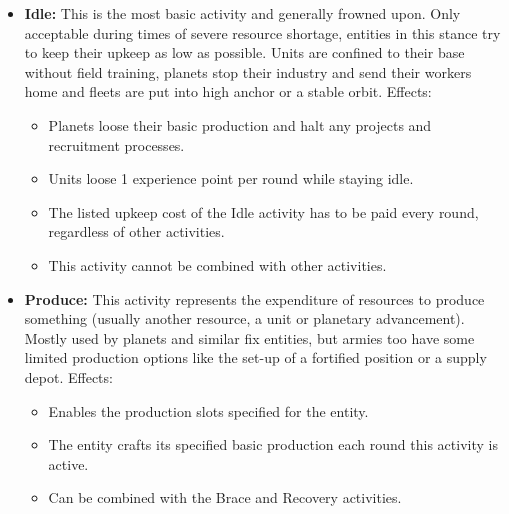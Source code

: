 \begin{itemize}
    \item \textbf{Idle:} This is the most basic activity and generally frowned upon. Only acceptable during times of severe resource shortage, entities in this stance try to keep their upkeep as low as possible. Units are confined to their base without field training, planets stop their industry and send their workers home and fleets are put into high anchor or a stable orbit. Effects:
    \begin{itemize}
        \item Planets loose their basic production and halt any projects and recruitment processes.
        \item Units loose 1 experience point per round while staying idle.
        \item The listed upkeep cost of the Idle activity has to be paid every round, regardless of other activities.
        \item This activity cannot be combined with other activities.
    \end{itemize}
    
    \item \textbf{Produce:} This activity represents the expenditure of resources to produce something (usually another resource, a unit or planetary advancement). Mostly used by planets and similar fix entities, but armies too have some limited production options like the set-up of a fortified position or a supply depot.
    Effects:
    \begin{itemize}
        \item Enables the production slots specified for the entity.
        \item The entity crafts its specified basic production each round this activity is active.
        \item Can be combined with the Brace and Recovery activities.
    \end{itemize}
    

\end{itemize}
